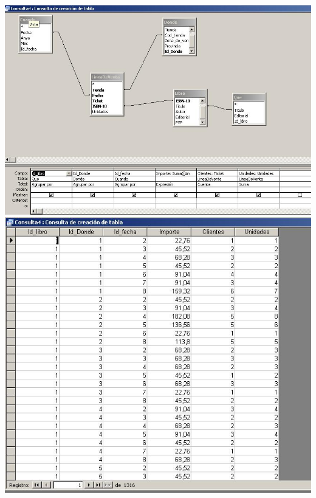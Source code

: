 \documentclass[paper=a4, fontsize=11pt, spanish]{scrartcl}
\numberwithin{equation}{section} %
\numberwithin{figure}{section} %
\numberwithin{table}{section} %
\begin{document}
\begin{center}
	\includegraphics[scale=0.6]{7.JPG}
	\includegraphics[scale=0.6]{8.JPG}
\end{center}
\end{document}
